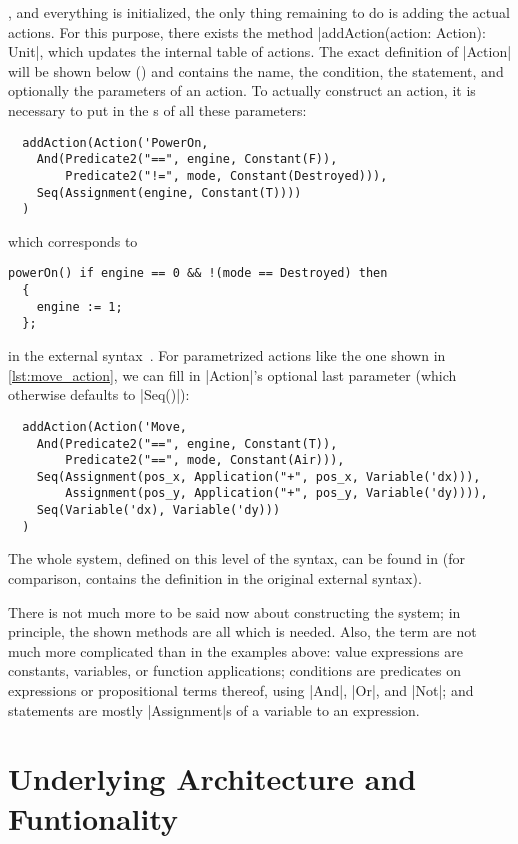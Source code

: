 , and everything is initialized, the only thing remaining to
do is adding the actual actions. For this purpose, there exists the method %
|addAction(action: Action): Unit|, which updates the internal table of actions. The exact definition
of |Action| will be shown below () and contains the name, the condition, the
statement, and optionally the parameters of an action. To actually construct an action, it is
necessary to put in the s of all these parameters:
\begin{lstlisting}
  addAction(Action('PowerOn,
    And(Predicate2("==", engine, Constant(F)), 
        Predicate2("!=", mode, Constant(Destroyed))),
    Seq(Assignment(engine, Constant(T))))
  )
\end{lstlisting}
which corresponds to
\begin{lstlisting}[language={}]
  powerOn() if engine == 0 && !(mode == Destroyed) then
  {
    engine := 1;
  };
\end{lstlisting}
in the external syntax~\cite{tappler2015:symbolic}. For parametrized actions like the one shown in
\autoref{lst:move_action}, we can fill in |Action|'s optional last parameter (which otherwise
defaults to |Seq()|):
\begin{lstlisting}
  addAction(Action('Move,
    And(Predicate2("==", engine, Constant(T)), 
        Predicate2("==", mode, Constant(Air))),
    Seq(Assignment(pos_x, Application("+", pos_x, Variable('dx))),
        Assignment(pos_y, Application("+", pos_y, Variable('dy)))),
    Seq(Variable('dx), Variable('dy)))
  )
\end{lstlisting}
The whole system, defined on this level of the syntax, can be found in 
(for comparison,  contains the definition in the original external
syntax).

There is not much more to be said now about constructing the system; in principle, the shown methods
are all which is needed. Also, the term \dsls{} are not much more complicated than in the examples
above: value expressions are constants, variables, or function applications; conditions are
predicates on expressions or propositional terms thereof, using |And|, |Or|, and |Not|; and
statements are mostly |Assignment|s of a variable to an expression.


\section{Underlying Architecture and Funtionality}
\label{sec:execution}

